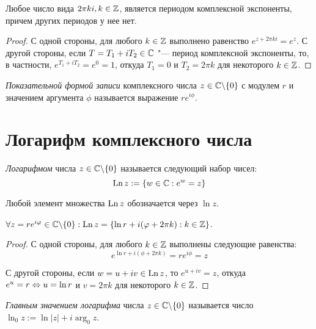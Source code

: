 \begin{proposition}
	Любое число вида $2\pi k i, k \in \mathbb{Z}$, является периодом комплексной экспоненты, причем других периодов у нее нет.
\end{proposition}

\begin{proof}
	С одной стороны, для любого $k \in \mathbb{Z}$ выполнено равенство $e^{z + 2\pi ki} = e^z$. С другой стороны, если $T = T_1 + iT_2 \in \mathbb{C}$ "--- период комплексной экспоненты, то, в частности, $e^{T_1 + iT_2} = e^0 = 1$, откуда $T_1 = 0$ и $T_2 = 2\pi k$ для некоторого $k \in \mathbb{Z}$.
\end{proof}

\begin{definition}
	\textit{Показательной формой записи} комплексного числа $z \in \mathbb{C} \backslash \{0\}$ с модулем $r$ и значением аргумента $\phi$ называется выражение $re^{i\phi}$.
\end{definition}

\section{Логарифм комплексного числа}

\begin{definition}
	\textit{Логарифмом} числа $z \in \mathbb{C} \backslash \{0\}$ называется следующий набор чисел:
	\[\operatorname{Ln}{z} := \left\{w \in \mathbb{C} : e^w = z\right\}\]
	
	Любой элемент множества $\operatorname{Ln}{z}$ обозначается через $\ln{z}$.
\end{definition}

\begin{proposition}
	$\forall z = re^{i\varphi} \in \mathbb{C} \backslash \{0\} : \operatorname{Ln}{z} = \{ \ln{r} + i(\varphi + 2\pi k) : k \in \mathbb{Z}\}$.
\end{proposition}

\begin{proof}
	С одной стороны, для любого $k \in \mathbb{Z}$ выполнены следующие равенства: \[e^{\ln{r} + i(\phi + 2\pi k)} = re^{i\phi} = z\]
	
	С другой стороны, если $w = u + iv \in \operatorname{Ln}{z}$, то $e^{u + iv} = z$, откуда $e^u = r \Leftrightarrow u = \ln{r}$ и $v = 2\pi k$ для некоторого $k \in \mathbb{Z}$.
\end{proof}

\begin{definition}
	\textit{Главным значением логарифма} числа $z \in \mathbb{C} \backslash \{0\}$ называется число $\ln_0{z} := \ln|z| + i\arg_0{z}$.
\end{definition}


